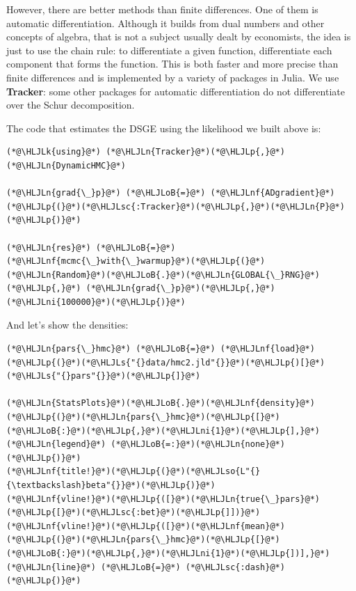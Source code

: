 \documentclass[12pt,a4paper]{article}
\newcommand{\HLJLk}[1]{\textcolor[RGB]{148,91,176}{\textbf{#1}}}
\newcommand{\HLJLn}[1]{#1}
\newcommand{\HLJLnf}[1]{\textcolor[RGB]{66,102,213}{#1}}
\newcommand{\HLJLs}[1]{\textcolor[RGB]{201,61,57}{#1}}
\newcommand{\HLJLsc}[1]{\textcolor[RGB]{201,61,57}{#1}}
\newcommand{\HLJLso}[1]{\textcolor[RGB]{201,61,57}{#1}}
\newcommand{\HLJLni}[1]{\textcolor[RGB]{59,151,46}{#1}}
\newcommand{\HLJLoB}[1]{\textcolor[RGB]{102,102,102}{\textbf{#1}}}
\newcommand{\HLJLp}[1]{#1}
\begin{document}
However, there are better methods than finite differences. One of them is automatic differentiation. Although it builds from dual numbers and other concepts of algebra, that is not a subject usually dealt by economists, the idea is just to use the chain rule: to differentiate a given function, differentiate each component that forms the function. This is both faster and more precise than finite differences and is implemented by a variety of packages in Julia. We use \textbf{Tracker}: some other packages for automatic differentiation do not differentiate over the Schur decomposition.

The code that estimates the DSGE using the likelihood we built above is:



\begin{lstlisting}
(*@\HLJLk{using}@*) (*@\HLJLn{Tracker}@*)(*@\HLJLp{,}@*) (*@\HLJLn{DynamicHMC}@*)

(*@\HLJLn{grad{\_}p}@*) (*@\HLJLoB{=}@*) (*@\HLJLnf{ADgradient}@*)(*@\HLJLp{(}@*)(*@\HLJLsc{:Tracker}@*)(*@\HLJLp{,}@*)(*@\HLJLn{P}@*)(*@\HLJLp{)}@*)

(*@\HLJLn{res}@*) (*@\HLJLoB{=}@*) (*@\HLJLnf{mcmc{\_}with{\_}warmup}@*)(*@\HLJLp{(}@*)(*@\HLJLn{Random}@*)(*@\HLJLoB{.}@*)(*@\HLJLn{GLOBAL{\_}RNG}@*)(*@\HLJLp{,}@*) (*@\HLJLn{grad{\_}p}@*)(*@\HLJLp{,}@*)(*@\HLJLni{100000}@*)(*@\HLJLp{)}@*)
\end{lstlisting}

And let's show the densities:


\begin{lstlisting}
(*@\HLJLn{pars{\_}hmc}@*) (*@\HLJLoB{=}@*) (*@\HLJLnf{load}@*)(*@\HLJLp{(}@*)(*@\HLJLs{"{}data/hmc2.jld"{}}@*)(*@\HLJLp{)[}@*)(*@\HLJLs{"{}pars"{}}@*)(*@\HLJLp{]}@*)

(*@\HLJLn{StatsPlots}@*)(*@\HLJLoB{.}@*)(*@\HLJLnf{density}@*)(*@\HLJLp{(}@*)(*@\HLJLn{pars{\_}hmc}@*)(*@\HLJLp{[}@*)(*@\HLJLoB{:}@*)(*@\HLJLp{,}@*)(*@\HLJLni{1}@*)(*@\HLJLp{],}@*) (*@\HLJLn{legend}@*) (*@\HLJLoB{=:}@*)(*@\HLJLn{none}@*)(*@\HLJLp{)}@*)
(*@\HLJLnf{title!}@*)(*@\HLJLp{(}@*)(*@\HLJLso{L"{}{\textbackslash}beta"{}}@*)(*@\HLJLp{)}@*)
(*@\HLJLnf{vline!}@*)(*@\HLJLp{([}@*)(*@\HLJLn{true{\_}pars}@*)(*@\HLJLp{[}@*)(*@\HLJLsc{:bet}@*)(*@\HLJLp{]])}@*)
(*@\HLJLnf{vline!}@*)(*@\HLJLp{([}@*)(*@\HLJLnf{mean}@*)(*@\HLJLp{(}@*)(*@\HLJLn{pars{\_}hmc}@*)(*@\HLJLp{[}@*)(*@\HLJLoB{:}@*)(*@\HLJLp{,}@*)(*@\HLJLni{1}@*)(*@\HLJLp{])],}@*) (*@\HLJLn{line}@*) (*@\HLJLoB{=}@*) (*@\HLJLsc{:dash}@*)(*@\HLJLp{)}@*)
\end{lstlisting}
\end{document}
